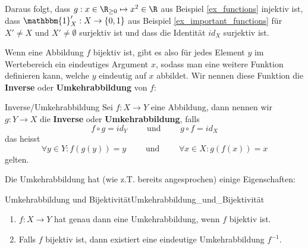 \begin{example}
Daraus folgt, dass $g: x \in \R_{\geq 0} \mapsto x^2 \in \R$ aus Beispiel \ref{ex_functions} injektiv ist, dass $\mathbbm{1}_X': X \to \{0, 1\}$ aus Beispiel \ref{ex_important_functions} für $X' \neq X$ und $X' \neq \emptyset$ surjektiv ist und dass die Identität $id_X$ surjektiv ist.
\end{example}

Wenn eine Abbildung $f$ bijektiv ist, gibt es also für jedes Element $y$ im Wertebereich ein eindeutiges Argument $x$, sodass man eine weitere Funktion definieren kann, welche $y$ eindeutig auf $x$ abbildet. Wir nennen diese Funktion die \textbf{Inverse} oder \textbf{Umkehrabbildung} von $f$:

\begin{definition}{Inverse/Umkehrabbildung}{}
Sei $f: X\to Y$ eine Abbildung, dann nennen wir $g: Y \to X$ die \textbf{Inverse} oder \textbf{Umkehrabbildung}, falls
$$f \circ g = id_Y \qquad \text{ und } \qquad g \circ f = id_X$$
das heisst
$$\forall y \in Y: f(g(y)) = y \qquad \text{ und } \qquad \forall x \in X: g(f(x)) = x$$
gelten.
\end{definition}

Die Umkehrabbildung hat (wie z.T. bereits angesprochen) einige Eigenschaften:

\begin{satz}{Umkehrabbildung und Bijektivität}{Umkehrabbildung_und_Bijektivität}
\begin{enumerate}
    \item $f: X \to Y$ hat genau dann eine Umkehrabbildung, wenn $f$ bijektiv ist.
    \item Falls $f$ bijektiv ist, dann existiert eine eindeutige Umkehrabbildung $f^{-1}$.
\end{enumerate}
\end{satz}


